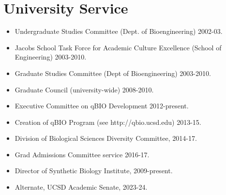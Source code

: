 \documentclass[11pt,a4paper,sans]{moderncv}        %
\begin{document}
\section{University Service}
\begin{itemize}
\item Undergraduate Studies Committee (Dept. of Bioengineering) 2002-03.
\item Jacobs School Task Force for Academic Culture Excellence (School of Engineering) 2003-2010.
\item Graduate Studies Committee (Dept of Bioengineering) 2003-2010.
\item Graduate Council (university-wide) 2008-2010.
\item Executive Committee on qBIO Development  2012-present.
\item Creation of qBIO Program (see http://qbio.ucsd.edu) 2013-15.
\item Division of Biological Sciences Diversity Committee, 2014-17.
\item Grad Admissions Committee service 2016-17.
\item Director of Synthetic Biology Institute, 2009-present.
\item Alternate, UCSD Academic Senate, 2023-24. 
\end{itemize}
%
%
%
%
%
\end{document}
